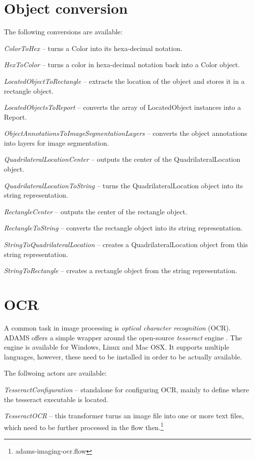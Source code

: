 \documentclass[a4paper]{book}
\begin{document}
\chapter{Object conversion}
The following conversions are available:
\begin{tight_itemize}
  \item \textit{ColorToHex} -- turns a Color into its hexa-decimal
  notation.
  \item \textit{HexToColor} -- turns a color in hexa-decimal notation back
  into a Color object.
  \item \textit{LocatedObjectToRectangle} -- extracts the location of the
  object and stores it in a rectangle object.
  \item \textit{LocatedObjectsToReport} -- converts the array of LocatedObject
  instances into a Report.
  \item \textit{ObjectAnnotationsToImageSegmentationLayers} -- converts the
  object annotations into layers for image segmentation.
  \item \textit{QuadrilateralLocationCenter} -- outputs the center of the
  QuadrilateralLocation object.
  \item \textit{QuadrilateralLocationToString} -- turns the
  QuadrilateralLocation object into its string representation.
  \item \textit{RectangleCenter} -- outputs the center of the rectangle object.
  \item \textit{RectangleToString} -- converts the rectangle object into its
  string representation.
  \item \textit{StringToQuadrilateralLocation} -- creates a QuadrilateralLocation
  object from this string representation.
  \item \textit{StringToRectangle} -- creates a rectangle object from the string
  representation.
\end{tight_itemize}


\chapter{OCR}
A common task in image processing is \textit{optical character recognition} 
(OCR). ADAMS offers a simple wrapper around the open-source \textit{tesseract} 
engine \cite{tesseract}. The engine is available for Windows, Linux and Mac OSX.
It supports multiple languages, however, these need to be installed in order to
be actually available.

The follwoing actors are available:
\begin{tight_itemize}
	\item \textit{TesseractConfiguration} -- standalone for configuring OCR, 
	mainly to define where the tesseract executable is located.
	\item \textit{TesseractOCR} -- this transformer turns an image file into
	one or more text files, which need to be further processed in the flow
	then.\footnote{adams-imaging-ocr.flow}
\end{tight_itemize}
\end{document}

